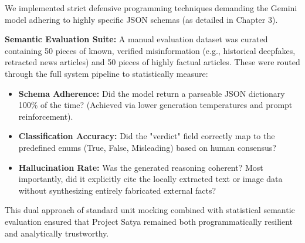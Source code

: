 We implemented strict defensive programming techniques demanding the Gemini model adhering to highly specific JSON schemas (as detailed in Chapter 3). 

\textbf{Semantic Evaluation Suite:}
A manual evaluation dataset was curated containing 50 pieces of known, verified misinformation (e.g., historical deepfakes, retracted news articles) and 50 pieces of highly factual articles. These were routed through the full system pipeline to statistically measure:
\begin{itemize}
    \item \textbf{Schema Adherence:} Did the model return a parseable JSON dictionary 100\% of the time? (Achieved via lower generation temperatures and prompt reinforcement).
    \item \textbf{Classification Accuracy:} Did the "verdict" field correctly map to the predefined enums (True, False, Misleading) based on human consensus?
    \item \textbf{Hallucination Rate:} Was the generated reasoning coherent? Most importantly, did it explicitly cite the locally extracted text or image data without synthesizing entirely fabricated external facts?
\end{itemize}

This dual approach of standard unit mocking combined with statistical semantic evaluation ensured that Project Satya remained both programmatically resilient and analytically trustworthy.

